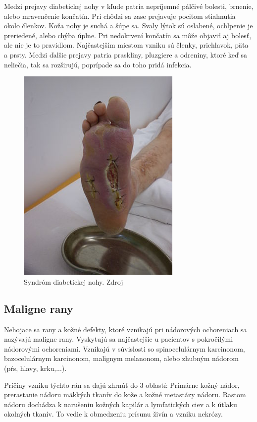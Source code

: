 Medzi prejavy diabetickej nohy v kľude patria nepríjemné pálčivé bolesti, brnenie, alebo mravenčenie končatín. Pri chôdzi sa zase prejavuje pocitom stiahnutia okolo členkov. Koža nohy je suchá a šúpe sa. Svaly lýtok sú oslabené, ochlpenie je preriedené, alebo chýba úplne. Pri nedokrvení končatín sa môže objaviť aj bolesť, ale nie je to pravidlom. Najčastejším miestom vzniku sú členky, priehlavok, päta a prsty. Medzi ďalšie prejavy patria praskliny, pľuzgiere a odreniny, ktoré keď sa neliečia, tak sa rozširujú, poprípade sa do toho pridá infekcia.
\begin{figure}[h]
  \centering
  \includegraphics[scale=2]{fig/diabeticka-noha.jpg}
  \caption{Syndróm diabetickej nohy. Zdroj \cite{uGOum7N9LzIGa5X2}}
  \label{fig:diabeticka-noha}
\end{figure}

\subsection{Maligne rany}
Nehojace sa rany a kožné defekty, ktoré vznikajú pri nádorových ochoreniach sa nazývajú maligne rany. Vyskytujú sa najčastejšie u pacientov s pokročilými nádorovými ochoreniami. Vznikajú v súvislosti so spinocelulárnym karcinonom, bazocelulárnym karcinonom, malignym melanonom, alebo zhubným nádorom (pŕs, hlavy, krku,...).

Príčiny vzniku týchto rán sa dajú zhrnúť do 3 oblastí: Primárne kožný nádor, prerastanie nádoru mäkkých tkanív do kože a kožné metastázy nádoru. Rastom nádoru dochádza k narušeniu kožných kapilár a lymfatických ciev a k útlaku okolných tkanív. To vedie k obmedzeniu prísunu živín a vzniku nekrózy.

